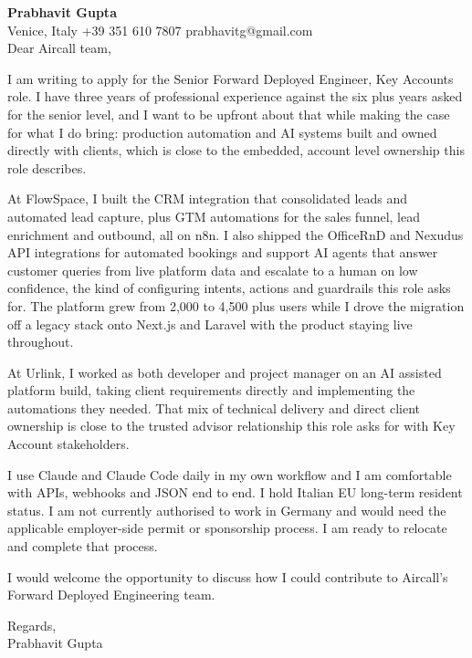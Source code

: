 \documentclass[a4paper,10.5pt]{article}
\begin{document}
\textbf{Prabhavit Gupta}\\
Venice, Italy \textbar{} +39 351 610 7807 \textbar{} prabhavitg@gmail.com\\[10pt]
Dear Aircall team,

I am writing to apply for the Senior Forward Deployed Engineer, Key Accounts role. I have three years of professional experience against the six plus years asked for the senior level, and I want to be upfront about that while making the case for what I do bring: production automation and AI systems built and owned directly with clients, which is close to the embedded, account level ownership this role describes.

At FlowSpace, I built the CRM integration that consolidated leads and automated lead capture, plus GTM automations for the sales funnel, lead enrichment and outbound, all on n8n. I also shipped the OfficeRnD and Nexudus API integrations for automated bookings and support AI agents that answer customer queries from live platform data and escalate to a human on low confidence, the kind of configuring intents, actions and guardrails this role asks for. The platform grew from 2,000 to 4,500 plus users while I drove the migration off a legacy stack onto Next.js and Laravel with the product staying live throughout.

At Urlink, I worked as both developer and project manager on an AI assisted platform build, taking client requirements directly and implementing the automations they needed. That mix of technical delivery and direct client ownership is close to the trusted advisor relationship this role asks for with Key Account stakeholders.

I use Claude and Claude Code daily in my own workflow and I am comfortable with APIs, webhooks and JSON end to end. I hold Italian EU long-term resident status. I am not currently authorised to work in Germany and would need the applicable employer-side permit or sponsorship process. I am ready to relocate and complete that process.

I would welcome the opportunity to discuss how I could contribute to Aircall's Forward Deployed Engineering team.

Regards,\\
Prabhavit Gupta
\end{document}
